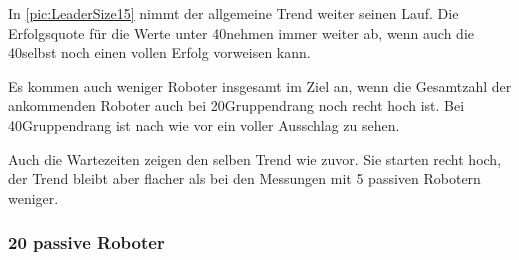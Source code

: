 In \autoref{pic:LeaderSize15} nimmt der allgemeine Trend weiter seinen Lauf. Die Erfolgsquote für die Werte unter 40\per nehmen immer weiter ab, wenn auch die 40\per selbst noch einen vollen Erfolg vorweisen kann.

Es kommen auch weniger Roboter insgesamt im Ziel an, wenn die Gesamtzahl der ankommenden Roboter auch bei 20\per Gruppendrang noch recht hoch ist. Bei 40\per Gruppendrang ist nach wie vor ein voller Ausschlag zu sehen.

Auch die Wartezeiten zeigen den selben Trend wie zuvor. Sie starten recht hoch, der Trend bleibt aber flacher als bei den Messungen mit 5 passiven Robotern weniger.

\subsubsection*{20 passive Roboter}

